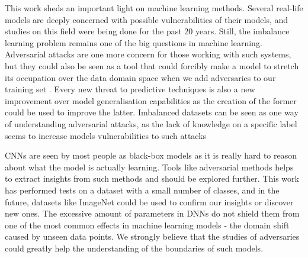\documentclass[runningheads,a4paper]{llncs}
\begin{document}
This work sheds an important light on machine learning methods. Several real-life models are deeply concerned with possible vulnerabilities of their models, and studies on this field were being done for the past 20 years. Still, the imbalance learning problem remains one of the big questions in machine learning. Adversarial attacks are one more concern for those working with such systems, but they could also be seen as a tool that could forcibly make a model to stretch its occupation over the data domain space when we add adversaries to our training set \cite{goodfellow2016}. Every new threat to predictive techniques is also a new improvement over model generalisation capabilities as the creation of the former could be used to improve the latter. Imbalanced datasets can be seen as one way of understanding adversarial attacks, as the lack of knowledge on a specific label seems to increase models vulnerabilities to such attacks

CNNs are seen by most people as black-box models as it is really hard to reason about what the model is actually learning. Tools like adversarial methods helps to extract insights from such methods and should be explored further. This work has performed tests on a dataset with a small number of classes, and in the future, datasets like ImageNet could be used to confirm our insights or discover new ones. The excessive amount of parameters in DNNs do not shield them from one of the most common effects in machine learning models - the domain shift caused by unseen data points. We strongly believe that the studies of adversaries could greatly help the understanding of the boundaries of such models.


 

\end{document}
